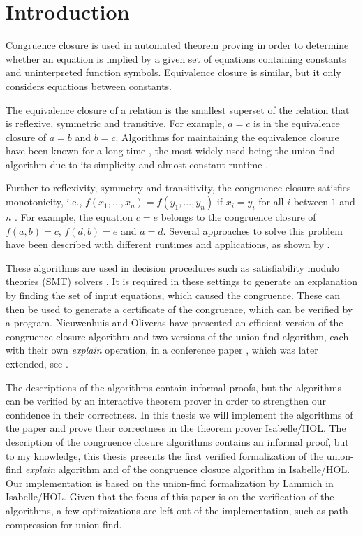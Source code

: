 
\chapter{Introduction}\label{chapter:introduction}

Congruence closure is used in automated theorem proving in order to determine whether an equation is implied by a given set of equations containing constants and uninterpreted function symbols. Equivalence closure is similar, but it only considers equations between constants.

The equivalence closure of a relation is the smallest superset of the relation that is reflexive, symmetric and transitive. For example, $a = c$ is in the equivalence closure of $a = b$ and $b = c$. Algorithms for maintaining the equivalence closure have been known for a long time \cite{unionfind-og}, the most widely used being the union-find algorithm due to its simplicity and almost constant runtime \cite{Tarjan}.

Further to reflexivity, symmetry and transitivity, the congruence closure satisfies monotonicity, i.e., $f(x_1, ... ,x_n) = f(y_1, ... ,y_n)$ if $x_i = y_i$ for all $i$ between $1$ and $n$ \cite{Nieuwenhuis}. For example, the equation $c = e$ belongs to the congruence closure of $f(a,b) = c$, $f(d,b) = e$ and $a = d$. Several approaches to solve this problem have been described with different runtimes and applications, as shown by \cite{congruenceclosure-og2,congruenceclosure-og,congruenceclosure-og3,Nieuwenhuis}.

These algorithms are used in decision procedures such as satisfiability modulo theories (SMT) solvers \cite{z3}. It is required in these settings to generate an explanation by finding the set of input equations, which caused the congruence. These can then be used to generate a certificate of the congruence, which can be verified by a program. Nieuwenhuis and Oliveras have presented an efficient version of the congruence closure algorithm and two versions of the union-find algorithm, each with their own \emph{explain} operation, in a conference paper \cite{Nieuwenhuis}, which was later extended, see \cite{Nieuwenhuis2}.

The descriptions of the algorithms contain informal proofs, but the algorithms can be verified by an interactive theorem prover in order to strengthen our confidence in their correctness. In this thesis we will implement the algorithms of the paper \cite{Nieuwenhuis} and prove their correctness in the theorem prover Isabelle/HOL.  The description of the congruence closure algorithms contains an informal proof, but to my knowledge, this thesis presents the first verified formalization of the union-find \emph{explain} algorithm and of the congruence closure algorithm in Isabelle/HOL. Our implementation is based on the union-find formalization by Lammich \cite{unionfind-isabelle} in Isabelle/HOL. Given that the focus of this paper is on the verification of the algorithms, a few optimizations are left out of the implementation, such as path compression for union-find.


